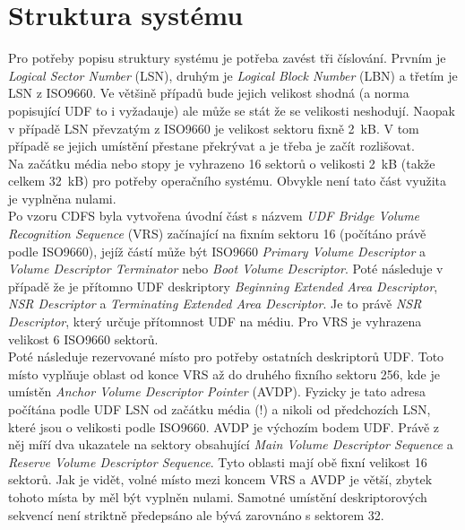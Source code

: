 \section{Struktura systému}
Pro potřeby popisu struktury systému je potřeba zavést tři číslování. Prvním je \textit{Logical Sector Number} (LSN), druhým je \textit{Logical Block Number} (LBN) a třetím je LSN z ISO9660. Ve většině případů bude jejich velikost shodná (a norma popisující UDF to i vyžadauje) ale může se stát že se velikosti neshodují. Naopak v případě LSN převzatým z ISO9660 je velikost sektoru fixně 2~kB. V tom případě se jejich umístění přestane překrývat a je třeba je začít rozlišovat.\\
Na začátku média nebo stopy je vyhrazeno 16 sektorů o velikosti 2~kB (takže celkem 32~kB) pro potřeby operačního systému. Obvykle není tato část využita je vyplněna nulami.\\
Po vzoru CDFS byla vytvořena úvodní část s názvem \textit{UDF Bridge Volume Recognition Sequence} (VRS) začínající na fixním sektoru 16 (počítáno právě podle ISO9660), jejíž částí může být ISO9660 \textit{Primary Volume Descriptor} a \textit{Volume Descriptor Terminator} nebo \textit{Boot Volume Descriptor}. Poté následuje v případě že je přítomno UDF deskriptory \textit{Beginning Extended Area Descriptor}, \textit{NSR Descriptor} a \textit{Terminating Extended Area Descriptor}. Je to právě \textit{NSR Descriptor}, který určuje přítomnost UDF na médiu. Pro VRS je vyhrazena velikost 6 ISO9660 sektorů.\\
Poté následuje rezervované místo pro potřeby ostatních deskriptorů UDF. Toto místo vyplňuje oblast od konce VRS až do druhého fixního sektoru 256, kde je umístěn \textit{Anchor Volume Descriptor Pointer} (AVDP). Fyzicky je tato adresa počítána podle UDF LSN od začátku média (!) a nikoli od předchozích LSN, které jsou o velikosti podle ISO9660. AVDP je výchozím bodem UDF. Právě z něj míří dva ukazatele na sektory obsahující \textit{Main Volume Descriptor Sequence} a \textit{Reserve Volume Descriptor Sequence}. Tyto oblasti mají obě fixní velikost 16 sektorů. Jak je vidět, volné místo mezi koncem VRS a AVDP je větší, zbytek tohoto místa by měl být vyplněn nulami. Samotné umístění deskriptorových sekvencí není striktně předepsáno ale bývá zarovnáno s sektorem 32.\\
